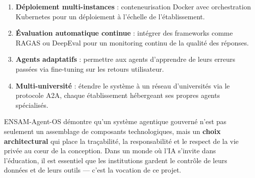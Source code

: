 \documentclass[12pt, a4paper]{article}
\begin{document}
\begin{enumerate}
  \item \textbf{Déploiement multi-instances} : conteneurisation Docker avec orchestration Kubernetes pour un déploiement à l'échelle de l'établissement.
  \item \textbf{Évaluation automatique continue} : intégrer des frameworks comme RAGAS ou DeepEval pour un monitoring continu de la qualité des réponses.
  \item \textbf{Agents adaptatifs} : permettre aux agents d'apprendre de leurs erreurs passées via fine-tuning sur les retours utilisateur.
  \item \textbf{Multi-université} : étendre le système à un réseau d'universités via le protocole A2A, chaque établissement hébergeant ses propres agents spécialisés.
\end{enumerate}

\vspace{1cm}

\begin{notebox}
ENSAM-Agent-OS démontre qu'un système agentique gouverné n'est pas seulement un assemblage de composants technologiques, mais un \textbf{choix architectural} qui place la traçabilité, la responsabilité et le respect de la vie privée au c\oe{}ur de la conception. Dans un monde où l'IA s'invite dans l'éducation, il est essentiel que les institutions gardent le contrôle de leurs données et de leurs outils — c'est la vocation de ce projet.
\end{notebox}
\end{document}
